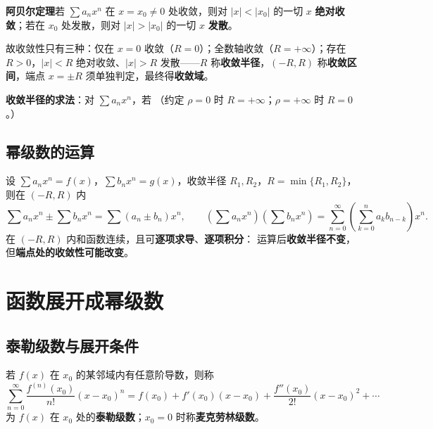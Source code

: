 \textbf{阿贝尔定理}\quad 若 $\sum a_nx^n$ 在 $x=x_0\ne0$ 处收敛，则对 $|x|<|x_0|$ 的一切 $x$ \textbf{绝对收敛}；若在 $x_0$ 处发散，则对 $|x|>|x_0|$ 的一切 $x$ \textbf{发散}。

故收敛性只有三种：仅在 $x=0$ 收敛（$R=0$）；全数轴收敛（$R=+\infty$）；存在 $R>0$，$|x|<R$ 绝对收敛、$|x|>R$ 发散——$R$ 称\textbf{收敛半径}，$(-R,R)$ 称\textbf{收敛区间}，端点 $x=\pm R$ 须单独判定，最终得\textbf{收敛域}。

\textbf{收敛半径的求法}：对 $\sum a_nx^n$，若
（约定 $\rho=0$ 时 $R=+\infty$；$\rho=+\infty$ 时 $R=0$。）


\subsection{幂级数的运算}

设 $\sum a_nx^n=f(x)$，$\sum b_nx^n=g(x)$，收敛半径 $R_1,R_2$，$R=\min\{R_1,R_2\}$，则在 $(-R,R)$ 内
\[
\sum a_nx^n\pm\sum b_nx^n=\sum(a_n\pm b_n)x^n,\qquad
\left(\sum a_nx^n\right)\left(\sum b_nx^n\right)=\sum_{n=0}^{\infty}\left(\sum_{k=0}^{n}a_kb_{n-k}\right)x^n .
\]
在 $(-R,R)$ 内和函数连续，且可\textbf{逐项求导}、\textbf{逐项积分}：
运算后\textbf{收敛半径不变}，但\textbf{端点处的收敛性可能改变}。


\section{函数展开成幂级数}
\subsection{泰勒级数与展开条件}

若 $f(x)$ 在 $x_0$ 的某邻域内有任意阶导数，则称
\[
\sum_{n=0}^{\infty}\frac{f^{(n)}(x_0)}{n!}(x-x_0)^n=f(x_0)+f'(x_0)(x-x_0)+\frac{f''(x_0)}{2!}(x-x_0)^2+\cdots
\]
为 $f(x)$ 在 $x_0$ 处的\textbf{泰勒级数}；$x_0=0$ 时称\textbf{麦克劳林级数}。

